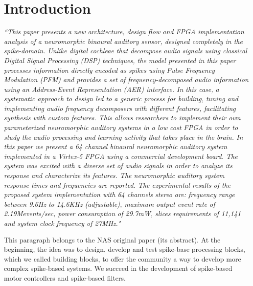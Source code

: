 \section{Introduction}
\label{sec:Introduction}
\textit{``This paper presents a new architecture, design flow and FPGA implementation analysis of a neuromorphic binaural auditory sensor, designed completely in the spike-domain. Unlike digital cochleae that decompose audio signals using classical Digital Signal Processing (DSP) techniques, the model presented in this paper processes information directly encoded as spikes using Pulse Frequency Modulation (PFM) and provides a set of frequency-decomposed audio information using an Address-Event Representation (AER) interface. In this case, a systematic approach to design led to a generic process for building, tuning and implementing audio frequency decomposers with different features, facilitating synthesis with custom features. This allows researchers to implement their own parameterized neuromorphic auditory systems in a low cost FPGA in order to study the audio processing and learning activity that takes place in the brain. In this paper we present a 64 channel binaural neuromorphic auditory system implemented in a Virtex-5 FPGA using a commercial development board. The system was excited with a diverse set of audio signals in order to analyze its response and characterize its features. The neuromorphic auditory system response times and frequencies are reported. The experimental results of the proposed system implementation with 64 channels stereo are: frequency range between 9.6Hz to 14.6KHz (adjustable), maximum output event rate of 2.19Mevents/sec, power consumption of 29.7mW, slices requirements of 11,141 and system clock frequency of 27MHz."} 


This paragraph belongs to the NAS \cite{jimenez2017binaural} original paper (its abstract). At the beginning, the idea was to design, develop and test spike-base processing blocks, which we called building blocks, to offer the community a way to develop more complex spike-based systems. We succeed in the development of spike-based motor controllers and spike-based filters.

